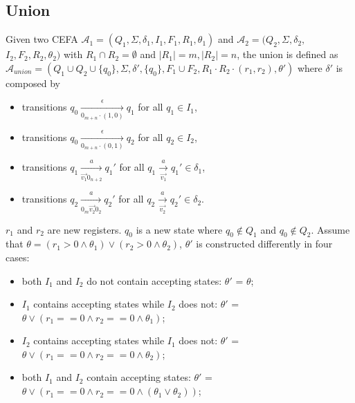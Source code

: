 \documentclass[runningheads]{llncs}
\newcommand*{\myvec}[1]{\vec{#1}}
\newcommand*{\aut}{\mathcal{A}}
\begin{document}
\subsection{Union}\label{subsec:union}
Given two CEFA $\aut_1 = (Q_1, \Sigma, \delta_1, I_1, F_1, R_1, \theta_1)$ and $\aut_2 = (Q_2, \Sigma, \delta_2,$ $I_2, F_2, R_2, \theta_2)$ with $R_1\cap R_2 = \emptyset$ and $|R_1|=m,|R_2|=n$, the union is defined as $\aut_{union} = (Q_1\cup Q_2\cup\{q_0\}, \Sigma, \delta', \{q_0\}, F_1\cup F_2, R_1\cdot R_2\cdot (r_1, r_2), \theta')$ where $\delta'$ is composed by
\begin{itemize}
  \item transitions $q_0\xrightarrow[0_{m+n}\cdot(1,0)]{\epsilon}q_1$ for all $q_1\in I_1$,
  \item transitions $q_0\xrightarrow[0_{m+n}\cdot(0,1)]{\epsilon}q_2$ for all $q_2\in I_2$,
  \item transitions $q_1\xrightarrow[\myvec{v_1}0_{n+2}]{a} q_1'$ for all $q_1\xrightarrow[\myvec{v_1}]{a} q_1'\in \delta_1$,
  \item transitions $q_2\xrightarrow[0_m\myvec{v_2}0_2]{a} q_2'$ for all $q_2\xrightarrow[\myvec{v_2}]{a} q_2'\in \delta_2$.
\end{itemize}
$r_1$ and $r_2$ are new registers. $q_0$ is a new state where $q_0\not\in Q_1$ and $q_0\not\in Q_2$. Assume that $\theta  = (r_1>0\wedge\theta_1)\vee(r_2>0\wedge\theta_2)$, $\theta'$ is constructed differently in four cases:
\begin{itemize}
  \item both $I_1$ and $I_2$ do not contain accepting states: $\theta'$ = $\theta $;
  \item $I_1$ contains accepting states while $I_2$ does not: $\theta'$ = $\theta \vee (r_1==0\wedge r_2==0\wedge\theta_1)$;
  \item $I_2$ contains accepting states while $I_1$ does not: $\theta'$ = $\theta \vee (r_1==0\wedge r_2==0\wedge\theta_2)$;
  \item both $I_1$ and $I_2$ contain accepting states: $\theta'$ = $\theta \vee (r_1==0\wedge r_2==0\wedge(\theta_1\vee\theta_2))$;
\end{itemize}
\end{document}
